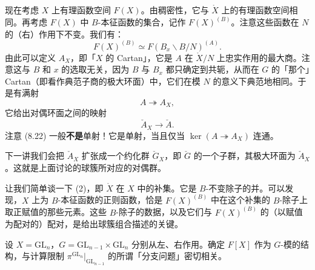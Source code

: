 现在考虑 $X$ 上有理函数空间 $F(X)$。由稠密性，它与 $\mathring X$ 上的有理函数空间相同。再考虑 $F(X)$ 中 $B$-本征函数的集合，记作 $F(X)^{(B)}$。注意这些函数在 $N$ 的（右）作用下不变。我们有：
\begin{equation}
  F(X)^{(B)}\simeq F(B_x\backslash B/N)^{(A)}.
  \label{eq:8-20}
\end{equation}
由此可以定义 $A_X$，即「$X$ 的 Cartan」，它是 $A$ 在 $\mathring X/N$ 上忠实作用的最大商。注意这与 $B$ 和 $x$ 的选取无关，因为 $B$ 与 $B_x$ 都只确定到共轭，从而在 $G$ 的「那个」Cartan（即看作典范子商的极大环面）中，它们在模 $N$ 的意义下典范地相同。于是有满射
\begin{equation}
  A\twoheadrightarrow A_X,
  \label{eq:8-21}
\end{equation}
它给出对偶环面之间的映射
\begin{equation}
  \check A_X\to\check A.
  \label{eq:8-22}
\end{equation}
注意 (8.22) 一般\textbf{不是}单射！它是单射，当且仅当 $\ker(A\twoheadrightarrow A_X)$ 连通。

下一讲我们会把 $\check A_X$ 扩张成一个约化群 $\check G_X$，即 $\check G$ 的一个子群，其极大环面为 $\check A_X$。这就是上面讨论的球簇所对应的对偶群。

让我们简单谈一下 (2)，即 $\mathring X$ 在 $X$ 中的补集。它是 $B$-不变除子的并。可以发现，$X$ 上为 $B$-本征函数的正则函数，恰是 $F(X)^{(B)}$ 中在这个补集的 $B$-除子上取正赋值的那些元素。这些 $B$-除子的数据，以及它们与 $F(X)^{(B)}$ 的（以赋值为配对的）配对，是给出球簇组合描述的关键。

\begin{exmp}
  设 $X=\mathrm{GL}_n$，$G=\mathrm{GL}_{n-1}\times\mathrm{GL}_n$ 分别从左、右作用。确定 $F[X]$ 作为 $G$-模的结构，与计算限制 $\pi^{\mathrm{GL}_n}|_{\mathrm{GL}_{n-1}}$ 的所谓「分支问题」密切相关。
\end{exmp}
